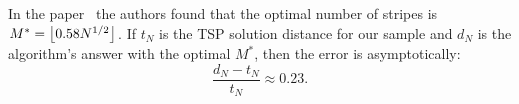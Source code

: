 \begin{figure}[ht]\label{TSP:pic0}
    \centering
\end{figure}

In the paper~\cite{gzyl1990physicist} the authors found that the optimal  number of stripes is $M^* = \left\lfloor0.58 N^{1/2}\right\rfloor$. If $t_N$ is the TSP solution distance for our sample and $d_N$ is the algorithm's answer with the optimal $M^*$, then the error is asymptotically:
\[  \frac{d_N-t_N}{t_N} \approx 0.23.\] 

